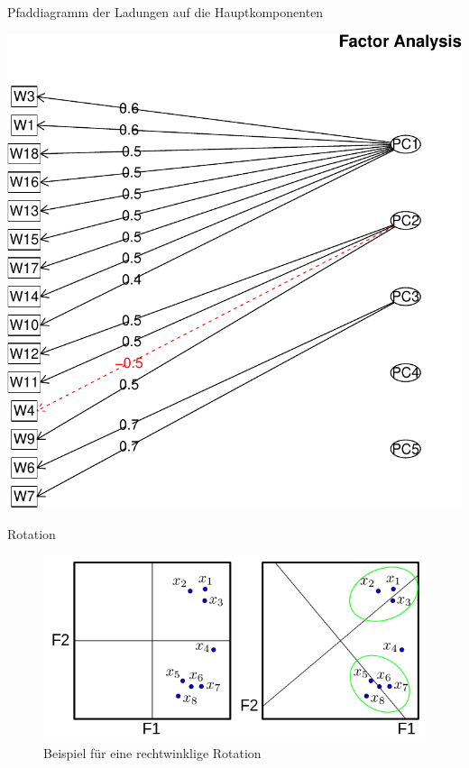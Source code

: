 \begin{frame}[fragile]{Pfaddiagramm der Ladungen auf die
Hauptkomponenten}

\begin{Shaded}
\begin{Highlighting}[]
\end{Highlighting}
\end{Shaded}

\begin{center}\includegraphics[width=0.4\linewidth]{PraDa_Folien_nm_2_files/figure-beamer/unnamed-chunk-30-1} \end{center}

\end{frame}

\begin{frame}{Rotation}

\begin{figure}

{\centering \includegraphics[width=0.5\linewidth]{../images/dimred/rotation} 

}

\caption{Beispiel für eine rechtwinklige Rotation}\label{fig:rotation}
\end{figure}

\end{frame}

